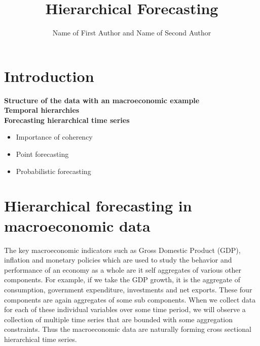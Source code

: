 \documentclass[graybox]{svmult}
\begin{document}
\title*{Hierarchical Forecasting}
\author{Name of First Author and Name of Second Author}
%
%
\maketitle



\section{Introduction}

\textbf{Structure of the data with an macroeconomic example}\\

\textbf{Temporal hierarchies}\\

\textbf{Forecasting hierarchical time series}\\

\begin{itemize}
	\item Importance of coherency
	\item Point forecasting
	\item Probabilistic forecasting
\end{itemize}

\section{Hierarchical forecasting in macroeconomic data}

The key macroeconomic indicators such as Gross Domestic Product (GDP), inflation and monetary policies which are used to study the behavior and performance of an economy as a whole are it self aggregates of various other components.
For example, if we take the GDP growth, it is the aggregate of consumption, government expenditure, investments and net exports. These four components are again aggregates of some sub components. When we collect data for each of these individual variables over some time period, we will observe a collection of multiple time series that are bounded with some aggregation constraints. Thus the macroeconomic data are naturally forming cross sectional hierarchical time series.
\end{document}
